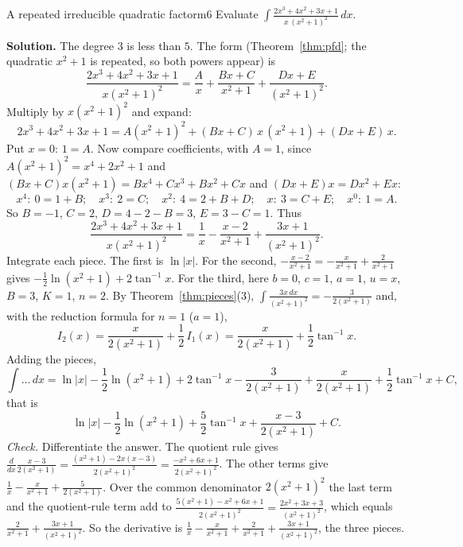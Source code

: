 \documentclass[11pt]{article}
\begin{document}
\begin{exmp}{A repeated irreducible quadratic factor}{m6}
Evaluate $\displaystyle\int\frac{2x^3+4x^2+3x+1}{x\,(x^2+1)^2}\,dx$.

\textbf{Solution.} The degree $3$ is less than $5$. The form (Theorem~\ref{thm:pfd}; the quadratic $x^2+1$ is repeated, so both powers appear) is
\[\frac{2x^3+4x^2+3x+1}{x(x^2+1)^2}=\frac Ax+\frac{Bx+C}{x^2+1}+\frac{Dx+E}{(x^2+1)^2}.\]
Multiply by $x(x^2+1)^2$ and expand:
\[2x^3+4x^2+3x+1=A(x^2+1)^2+(Bx+C)\,x\,(x^2+1)+(Dx+E)\,x .\]
Put $x=0$: $1=A$. Now compare coefficients, with $A=1$, since $A(x^2+1)^2=x^4+2x^2+1$ and $(Bx+C)x(x^2+1)=Bx^4+Cx^3+Bx^2+Cx$ and $(Dx+E)x=Dx^2+Ex$:
\[x^4:\ 0=1+B;\quad x^3:\ 2=C;\quad x^2:\ 4=2+B+D;\quad x:\ 3=C+E;\quad x^0:\ 1=A.\]
So $B=-1$, $C=2$, $D=4-2-B=3$, $E=3-C=1$. Thus
\[\frac{2x^3+4x^2+3x+1}{x(x^2+1)^2}=\frac1x-\frac{x-2}{x^2+1}+\frac{3x+1}{(x^2+1)^2}.\]
Integrate each piece. The first is $\ln\lvert x\rvert$. For the second, $-\frac{x-2}{x^2+1}=-\frac x{x^2+1}+\frac2{x^2+1}$ gives $-\frac12\ln(x^2+1)+2\tan^{-1}x$. For the third, here $b=0$, $c=1$, $a=1$, $u=x$, $B=3$, $K=1$, $n=2$. By Theorem~\ref{thm:pieces}(3), $\int\frac{3x\,dx}{(x^2+1)^2}=-\frac3{2(x^2+1)}$ and, with the reduction formula for $n=1$ ($a=1$),
\[I_2(x)=\frac{x}{2(x^2+1)}+\frac12\,I_1(x)=\frac x{2(x^2+1)}+\frac12\tan^{-1}x .\]
Adding the pieces,
\[\int\ldots\,dx=\ln\lvert x\rvert-\frac12\ln(x^2+1)+2\tan^{-1}x-\frac3{2(x^2+1)}+\frac x{2(x^2+1)}+\frac12\tan^{-1}x+C ,\]
that is
\[\ln\lvert x\rvert-\frac12\ln\left(x^2+1\right)+\frac52\tan^{-1}x+\frac{x-3}{2(x^2+1)}+C .\]
\emph{Check.} Differentiate the answer. The quotient rule gives $\frac{d}{dx}\frac{x-3}{2(x^2+1)}=\frac{(x^2+1)-2x(x-3)}{2(x^2+1)^2}=\frac{-x^2+6x+1}{2(x^2+1)^2}$. The other terms give $\frac1x-\frac x{x^2+1}+\frac5{2(x^2+1)}$. Over the common denominator $2(x^2+1)^2$ the last term and the quotient-rule term add to $\frac{5(x^2+1)-x^2+6x+1}{2(x^2+1)^2}=\frac{2x^2+3x+3}{(x^2+1)^2}$, which equals $\frac2{x^2+1}+\frac{3x+1}{(x^2+1)^2}$. So the derivative is $\frac1x-\frac x{x^2+1}+\frac2{x^2+1}+\frac{3x+1}{(x^2+1)^2}$, the three pieces.
\end{exmp}
\end{document}
